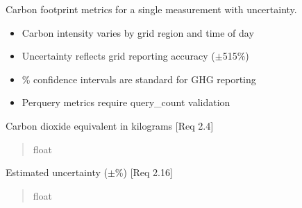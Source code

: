 \documentclass[letterpaper,10pt,english]{sphinxmanual}
\begin{document}
\begin{fulllineitems}
\sphinxAtStartPar
Carbon footprint metrics for a single measurement with uncertainty.
\begin{description}
\begin{itemize}
\item {} 
\sphinxAtStartPar
Carbon intensity varies by grid region and time of day

\item {} 
\sphinxAtStartPar
Uncertainty reflects grid reporting accuracy (\(\pm\)5\sphinxhyphen{}15\%)

\item {} 
\% confidence intervals are standard for GHG reporting

\item {} 
\sphinxAtStartPar
Per\sphinxhyphen{}query metrics require query\_count validation

\end{itemize}

\end{description}

\begin{fulllineitems}
\label{\detokenize{core.sustainability.models:core.sustainability.models.CarbonMetrics.kg}}
\pysigstartsignatures
\pysigline
{}
\pysigstopsignatures
\sphinxAtStartPar
Carbon dioxide equivalent in kilograms {[}Req 2.4{]}
\begin{quote}\begin{description}
\sphinxAtStartPar
float

\end{description}\end{quote}

\end{fulllineitems}


\begin{fulllineitems}
\label{\detokenize{core.sustainability.models:core.sustainability.models.CarbonMetrics.uncertainty_percent}}
\pysigstartsignatures
\pysigline
{}
\pysigstopsignatures
\sphinxAtStartPar
Estimated uncertainty (\(\pm\)\%) {[}Req 2.16{]}
\begin{quote}\begin{description}
\sphinxAtStartPar
float


\end{description}
\end{quote}
\end{fulllineitems}
\end{fulllineitems}
\end{document}
